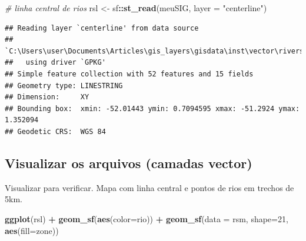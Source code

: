 \documentclass[
]{article}
\newenvironment{Shaded}{\begin{snugshade}}{\end{snugshade}}
\newcommand{\AttributeTok}[1]{\textcolor[rgb]{0.13,0.29,0.53}{#1}}
\newcommand{\CommentTok}[1]{\textcolor[rgb]{0.56,0.35,0.01}{\textit{#1}}}
\newcommand{\DecValTok}[1]{\textcolor[rgb]{0.00,0.00,0.81}{#1}}
\newcommand{\FunctionTok}[1]{\textcolor[rgb]{0.13,0.29,0.53}{\textbf{#1}}}
\newcommand{\NormalTok}[1]{#1}
\newcommand{\OtherTok}[1]{\textcolor[rgb]{0.56,0.35,0.01}{#1}}
\newcommand{\SpecialCharTok}[1]{\textcolor[rgb]{0.81,0.36,0.00}{\textbf{#1}}}
\newcommand{\StringTok}[1]{\textcolor[rgb]{0.31,0.60,0.02}{#1}}
\begin{document}
\begin{Shaded}
\begin{Highlighting}[]
\CommentTok{\# linha central de rios}
\NormalTok{rsl }\OtherTok{\textless{}{-}}\NormalTok{ sf}\SpecialCharTok{::}\FunctionTok{st\_read}\NormalTok{(meuSIG, }\AttributeTok{layer =} \StringTok{"centerline"}\NormalTok{)}
\end{Highlighting}
\end{Shaded}

\begin{verbatim}
## Reading layer `centerline' from data source 
##   `C:\Users\user\Documents\Articles\gis_layers\gisdata\inst\vector\rivers.gpkg' 
##   using driver `GPKG'
## Simple feature collection with 52 features and 15 fields
## Geometry type: LINESTRING
## Dimension:     XY
## Bounding box:  xmin: -52.01443 ymin: 0.7094595 xmax: -51.2924 ymax: 1.352094
## Geodetic CRS:  WGS 84
\end{verbatim}

\newpage

\hypertarget{visualizar-os-arquivos-camadas-vector-1}{%
\subsection{Visualizar os arquivos (camadas vector)}\label{visualizar-os-arquivos-camadas-vector-1}}

Visualizar para verificar. Mapa com linha central e pontos de rios em trechos de 5km.

\begin{Shaded}
\begin{Highlighting}[]
\FunctionTok{ggplot}\NormalTok{(rsl) }\SpecialCharTok{+}
  \FunctionTok{geom\_sf}\NormalTok{(}\FunctionTok{aes}\NormalTok{(}\AttributeTok{color=}\NormalTok{rio)) }\SpecialCharTok{+}
  \FunctionTok{geom\_sf}\NormalTok{(}\AttributeTok{data =}\NormalTok{ rsm, }\AttributeTok{shape=}\DecValTok{21}\NormalTok{, }\FunctionTok{aes}\NormalTok{(}\AttributeTok{fill=}\NormalTok{zone))}
\end{Highlighting}
\end{Shaded}
\end{document}
